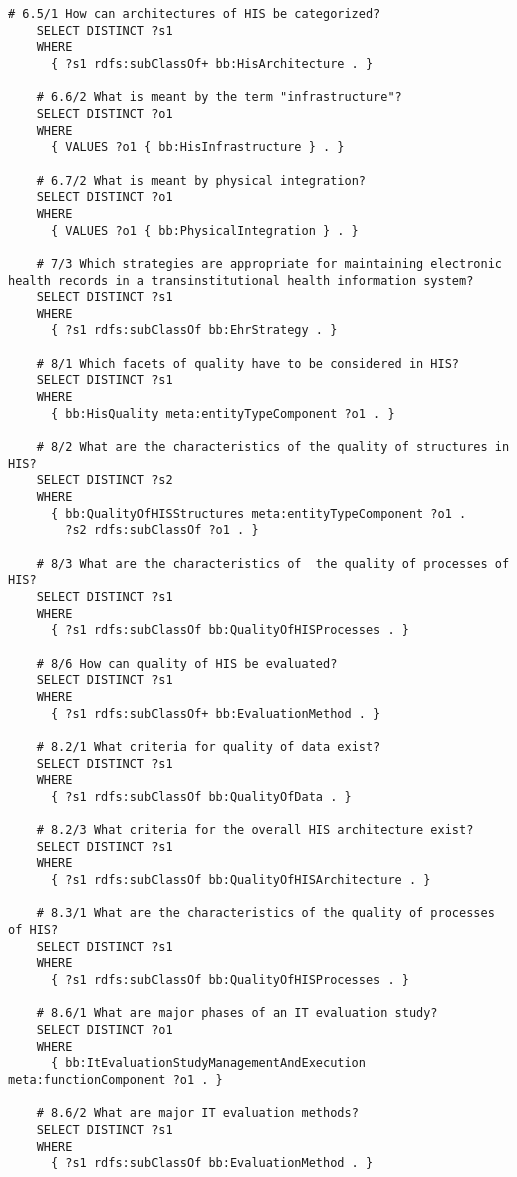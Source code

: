 \begin{lstlisting}[language=SPARQL]
    # 6.5/1 How can architectures of HIS be categorized?
    SELECT DISTINCT ?s1
    WHERE
      { ?s1 rdfs:subClassOf+ bb:HisArchitecture . }
    
    # 6.6/2 What is meant by the term "infrastructure"?
    SELECT DISTINCT ?o1
    WHERE
      { VALUES ?o1 { bb:HisInfrastructure } . }
    
    # 6.7/2 What is meant by physical integration?
    SELECT DISTINCT ?o1
    WHERE
      { VALUES ?o1 { bb:PhysicalIntegration } . }
    
    # 7/3 Which strategies are appropriate for maintaining electronic health records in a transinstitutional health information system?
    SELECT DISTINCT ?s1
    WHERE
      { ?s1 rdfs:subClassOf bb:EhrStrategy . }
    
    # 8/1 Which facets of quality have to be considered in HIS?
    SELECT DISTINCT ?s1
    WHERE
      { bb:HisQuality meta:entityTypeComponent ?o1 . }
    
    # 8/2 What are the characteristics of the quality of structures in HIS?
    SELECT DISTINCT ?s2
    WHERE
      { bb:QualityOfHISStructures meta:entityTypeComponent ?o1 .
        ?s2 rdfs:subClassOf ?o1 . }
    
    # 8/3 What are the characteristics of  the quality of processes of HIS?
    SELECT DISTINCT ?s1
    WHERE
      { ?s1 rdfs:subClassOf bb:QualityOfHISProcesses . }
    
    # 8/6 How can quality of HIS be evaluated?
    SELECT DISTINCT ?s1
    WHERE
      { ?s1 rdfs:subClassOf+ bb:EvaluationMethod . }
    
    # 8.2/1 What criteria for quality of data exist?
    SELECT DISTINCT ?s1
    WHERE
      { ?s1 rdfs:subClassOf bb:QualityOfData . }
    
    # 8.2/3 What criteria for the overall HIS architecture exist?
    SELECT DISTINCT ?s1
    WHERE
      { ?s1 rdfs:subClassOf bb:QualityOfHISArchitecture . }
    
    # 8.3/1 What are the characteristics of the quality of processes of HIS?
    SELECT DISTINCT ?s1
    WHERE
      { ?s1 rdfs:subClassOf bb:QualityOfHISProcesses . }
    
    # 8.6/1 What are major phases of an IT evaluation study?
    SELECT DISTINCT ?o1
    WHERE
      { bb:ItEvaluationStudyManagementAndExecution meta:functionComponent ?o1 . }
    
    # 8.6/2 What are major IT evaluation methods?
    SELECT DISTINCT ?s1
    WHERE
      { ?s1 rdfs:subClassOf bb:EvaluationMethod . }
    

\end{lstlisting}

